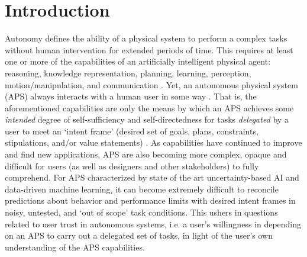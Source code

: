 \section{Introduction}
Autonomy defines the ability of a physical system to perform a complex tasks without human intervention for extended periods of time. This requires at least one or more of the capabilities of an artificially intelligent physical agent: reasoning, knowledge representation, planning, learning, perception, motion/manipulation, and communication \cite{Israelsen2017-ym}. 
Yet, an autonomous physical system (APS) always interacts with a human user in some way \cite{Bradshaw2013-ck}.  That is, the aforementioned capabilities are only the means by which an APS achieves some \emph{intended} degree of self-sufficiency and self-directedness for tasks \emph{delegated} by a user to meet an `intent frame' (desired set of goals, plans, constraints, stipulations, and/or value statements) \cite{Miller2014-av}. 
As capabilities have continued to improve and find new applications, APS are also becoming more complex, opaque and difficult for users (as well as designers and other stakeholders) to fully comprehend. For APS characterized by state of the art uncertainty-based AI and data-driven machine learning, it can become extremely difficult to reconcile predictions about behavior and performance limits with desired intent frames in noisy, untested, and `out of scope' task conditions. This ushers in questions related to user trust in autonomous systems, i.e. a user's willingness in depending on an APS to carry out a delegated set of tasks, in light of the user's own understanding of the APS capabilities. 

